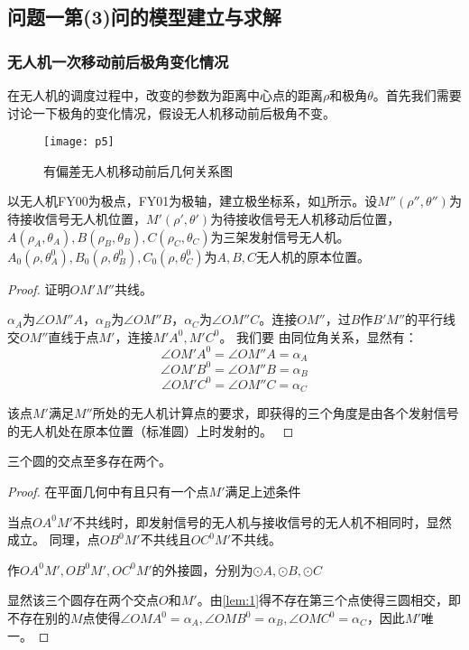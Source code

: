 \documentclass{cumcmthesis}
\begin{document}
\subsection{问题一第(3)问的模型建立与求解}
\subsubsection{无人机一次移动前后极角变化情况}



在无人机的调度过程中，改变的参数为距离中心点的距离$\rho$和极角$\theta$。首先我们需要讨论一下极角的变化情况，假设无人机移动前后极角不变。
\begin{figure}[!h]
	\centering
	\texttt{[image: p5]}
	\caption{有偏差无人机移动前后几何关系图}
	\label{fig:p5}
\end{figure}

以无人机FY00为极点，FY01为极轴，建立极坐标系，如\cref{fig:p5}所示。设$M''(\rho'',\theta'')$为待接收信号无人机位置，$M'(\rho',\theta')$为待接收信号无人机移动后位置，$A(\rho_A,\theta_{A}),B(\rho_{B},\theta_B),$$C(\rho_C,\theta_C)$为三架发射信号无人机。$A_0(\rho,\theta_A^0),B_0(\rho,\theta_B^0),C_0(\rho,\theta_C^0)$为$A,B,C$无人机的原本位置。
\begin{proof}
	证明$OM'M''$共线。
	
	$\alpha_{A}\text{为}\angle OM''A\text{，}\alpha_{B}\text{为}\angle OM''B\text{，}\alpha_{C}\text{为}\angle OM''C\text{。}$连接$OM''$，过$B$作$B'M''$的平行线交$OM''$直线于点$M'$，连接$M'A^0,M'C^0$。
	我们要
	由同位角关系，显然有：
	\[\angle OM'A^0=\angle OM''A=\alpha_{A}\]
	\[\angle OM'B^0=\angle OM''B=\alpha_{B}\]
	\[\angle OM'C^0=\angle OM''C=\alpha_{C}\]
	
	该点$M'$满足$M''$所处的无人机计算点的要求，即获得的三个角度是由各个发射信号的无人机处在原本位置（标准圆）上时发射的。
	\label{prf:example}
\end{proof}
\begin{lemma}
	三个圆的交点至多存在两个。
	\label{lem:1}
\end{lemma}
\begin{proof}
在平面几何中有且只有一个点$M'$满足上述条件


当点$OA^0M'$不共线时，即发射信号的无人机与接收信号的无人机不相同时，显然成立。
同理，点$OB^0M'$不共线且$OC^0M'$不共线。

作$OA^0M',OB^0M',OC^0M'$的外接圆，分别为$\odot A,\odot B,\odot C$

显然该三个圆存在两个交点$O$和$M'$。由\cref{lem:1}得不存在第三个点使得三圆相交，即不存在别的$M$点使得$\angle OMA^0=\alpha_{A},\angle OMB^0=\alpha_{B},\angle OMC^0=\alpha_{C}$，因此$M'$唯一。

\end{proof}
\end{document}
